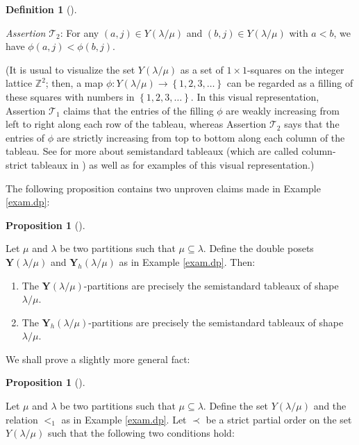 \documentclass[numbers=enddot,12pt,final,onecolumn,notitlepage,abstracton]{scrartcl}
\theoremstyle{definition}
\newtheorem{prop}[theo]{Proposition}
\newenvironment{proposition}[1][]
{\begin{prop}[#1]\begin{leftbar}}
{\end{leftbar}\end{prop}}
\newtheorem{defi}[theo]{Definition}
\newenvironment{definition}[1][]
{\begin{defi}[#1]\begin{leftbar}}
{\end{leftbar}\end{defi}}
\newenvironment{verlong}{}{}
\begin{document}
\begin{verlong}
\begin{footnotesize}
\begin{definition}
\textit{Assertion }$\mathcal{T}_{2}$: For any $\left(  a,j\right)  \in
Y\left(  \lambda/\mu\right)  $ and $\left(  b,j\right)  \in Y\left(
\lambda/\mu\right)  $ with $a<b$, we have $\phi\left(  a,j\right)
<\phi\left(  b,j\right)  $.

(It is usual to visualize the set $Y\left(  \lambda/\mu\right)  $ as a set of
$1\times1$-squares on the integer lattice $\mathbb{Z}^{2}$; then, a map
$\phi:Y\left(  \lambda/\mu\right)  \rightarrow\left\{  1,2,3,\ldots\right\}  $
can be regarded as a filling of these squares with numbers in $\left\{
1,2,3,\ldots\right\}  $. In this visual representation, Assertion
$\mathcal{T}_{1}$ claims that the entries of the filling $\phi$ are weakly
increasing from left to right along each row of the tableau, whereas Assertion
$\mathcal{T}_{2}$ says that the entries of $\phi$ are strictly increasing from
top to bottom along each column of the tableau. See \cite[\S 2.2]{Reiner} for
more about semistandard tableaux (which are called column-strict tableaux in
\cite{Reiner}) as well as for examples of this visual representation.)
\end{definition}

The following proposition contains two unproven claims made in Example
\ref{exam.dp}:

\begin{proposition}
\label{prop.example.sst}Let $\mu$ and $\lambda$ be two partitions such that
$\mu\subseteq\lambda$. Define the double posets $\mathbf{Y}\left(  \lambda
/\mu\right)  $ and $\mathbf{Y}_{h}\left(  \lambda/\mu\right)  $ as in Example
\ref{exam.dp}. Then:

\begin{enumerate}
\item[(a)] The $\mathbf{Y}\left(  \lambda/\mu\right)  $-partitions are
precisely the semistandard tableaux of shape $\lambda/\mu$.

\item[(b)] The $\mathbf{Y}_{h}\left(  \lambda/\mu\right)  $-partitions are
precisely the semistandard tableaux of shape $\lambda/\mu$.
\end{enumerate}
\end{proposition}

We shall prove a slightly more general fact:

\begin{proposition}
\label{prop.example.sst.gen}Let $\mu$ and $\lambda$ be two partitions such
that $\mu\subseteq\lambda$. Define the set $Y\left(  \lambda/\mu\right)  $ and
the relation $<_{1}$ as in Example \ref{exam.dp}. Let $\prec$ be a strict
partial order on the set $Y\left(  \lambda/\mu\right)  $ such that the
following two conditions hold:


\end{proposition}
\end{footnotesize}
\end{verlong}
\end{document}
